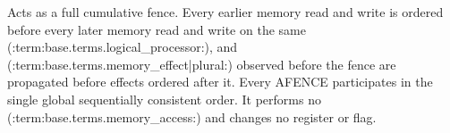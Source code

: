 Acts as a full cumulative fence. Every earlier memory read and write is ordered before every later memory read and write on the same (:term:base.terms.logical_processor:), and (:term:base.terms.memory_effect|plural:) observed before the fence are propagated before effects ordered after it. Every AFENCE participates in the single global sequentially consistent order. It performs no (:term:base.terms.memory_access:) and changes no register or flag.
